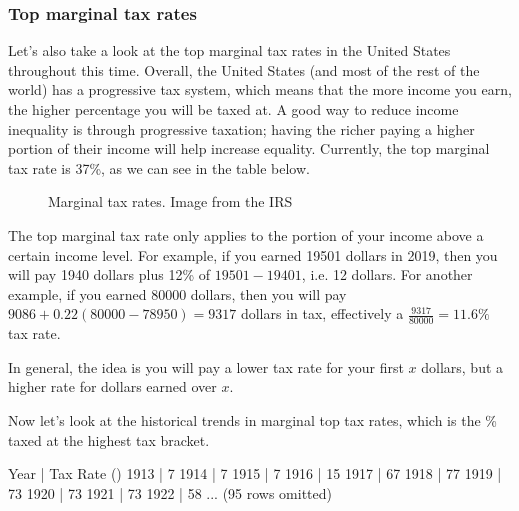 \documentclass[letterpaper,10pt,english]{jupyterBook}
\let\sphinxpxdimen\pdfpxdimen\else\newdimen\sphinxpxdimen
\begin{document}
\subsubsection{Top marginal tax rates}
\label{\detokenize{content/06-inequality/historical-inequality:top-marginal-tax-rates}}
\sphinxAtStartPar
Let’s also take a look at the top marginal tax rates in the United States throughout this time. Overall, the United States (and most of the rest of the world) has a progressive tax system, which means that the more income you earn, the higher percentage you will be taxed at. A good way to reduce income inequality is through progressive taxation; having the richer paying a higher portion of their income will help increase equality. Currently, the top marginal tax rate is 37\%, as we can see in the table below.

\begin{figure}[htbp]
\centering
\capstart

\noindent\sphinxincludegraphics[width=500\sphinxpxdimen]{{MTR}.png}
\caption{Marginal tax rates. Image from the IRS}\label{\detokenize{content/06-inequality/historical-inequality:irs}}\end{figure}

\sphinxAtStartPar
The top marginal tax rate only applies to the portion of your income above a certain income level. For example, if you earned 19501 dollars in 2019, then you will pay 1940 dollars plus 12\% of \(19501-19401\), i.e. 12 dollars. For another example, if you earned 80000 dollars, then you will pay \(9086 + 0.22(80000-78950) = 9317\) dollars in tax, effectively a \(\frac{9317}{80000} = 11.6\%\) tax rate.

\sphinxAtStartPar
In general, the idea is you will pay a lower tax rate for your first \(x\) dollars, but a higher rate for dollars earned over \(x\).

\sphinxAtStartPar
Now let’s look at the historical trends in marginal top tax rates, which is the \% taxed at the highest tax bracket.

\begin{sphinxVerbatim}[commandchars=\\\{\}]
  
\end{sphinxVerbatim}

\begin{sphinxVerbatim}[commandchars=\\\{\}]
Year | Tax Rate (\PYGZpc{})
1913 | 7
1914 | 7
1915 | 7
1916 | 15
1917 | 67
1918 | 77
1919 | 73
1920 | 73
1921 | 73
1922 | 58
... (95 rows omitted)
\end{sphinxVerbatim}
\end{document}
